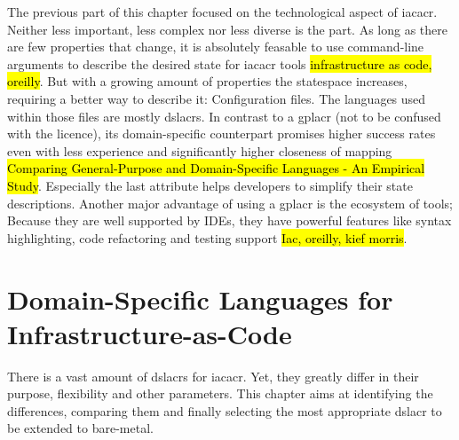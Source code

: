 \newline\smallskip
The previous part of this chapter focused on the technological  aspect of \gls{iacacr}. Neither less important, less complex nor less diverse is the  part.
\newline
As long as there are few properties that change, it is absolutely feasable to use command-line arguments to describe the desired state for \gls{iacacr} tools \hl{infrastructure as code, oreilly}. But with a growing amount of properties the statespace increases, requiring a better way to describe it: Configuration files. The languages used within those files are mostly \gls{dslacr}s. In contrast to a \gls{gplacr} (not to be confused with the licence), its domain-specific counterpart promises higher success rates even with less experience and significantly higher closeness of mapping \hl{Comparing General-Purpose and Domain-Specific Languages - An Empirical Study}. Especially the last attribute helps developers to simplify their state descriptions. Another major advantage of using a \gls{gplacr} is the ecosystem of tools; Because they are well supported by IDEs, they have powerful features like syntax highlighting, code refactoring and testing support \hl{Iac, oreilly, kief morris}.

\section{Domain-Specific Languages for Infrastructure-as-Code} %
There is a vast amount of \gls{dslacr}s for \gls{iacacr}. Yet, they greatly differ in their purpose, flexibility and other parameters. This chapter aims at identifying the differences, comparing them and finally selecting the most appropriate \gls{dslacr} to be extended to bare-metal.

